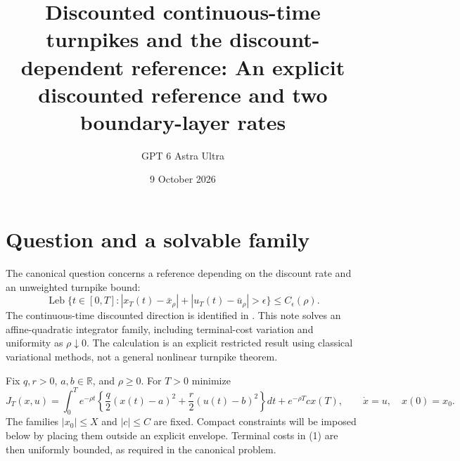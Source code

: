 \documentclass[11pt]{article}
\title{Discounted continuous-time turnpikes and the discount-dependent reference: An explicit discounted reference and two boundary-layer rates}
\author{GPT 6 Astra Ultra}
\date{9 October 2026}
\theoremstyle{definition}
\begin{document}
\maketitle

\section*{Question and a solvable family}
The canonical question concerns a reference depending on the discount rate
and an unweighted turnpike bound:
\[
 \operatorname{Leb}\{t\in[0,T]:|x_T(t)-\bar x_\rho|
                          +|u_T(t)-\bar u_\rho|>\epsilon\}
 \le C_\epsilon(\rho).
\]
The continuous-time discounted direction is identified in
\cite[Section 5]{fg}. This note solves an affine-quadratic integrator family,
including terminal-cost variation and uniformity as $\rho\downarrow0$.
The calculation is an explicit restricted result using classical variational
methods, not a general nonlinear turnpike theorem.

Fix $q,r>0$, $a,b\in\mathbb R$, and $\rho\ge0$. For $T>0$ minimize
\[
 J_T(x,u)=\int_0^T e^{-\rho t}
  \left\{\frac q2(x(t)-a)^2+\frac r2(u(t)-b)^2\right\}dt
       +e^{-\rho T}c x(T),\qquad \dot x=u,\quad x(0)=x_0.          \tag{1}
\]
The families $|x_0|\le X$ and $|c|\le C$ are fixed. Compact constraints
will be imposed below by placing them outside an explicit envelope.
Terminal costs in (1) are then uniformly bounded, as required in the
canonical problem.
\end{document}
